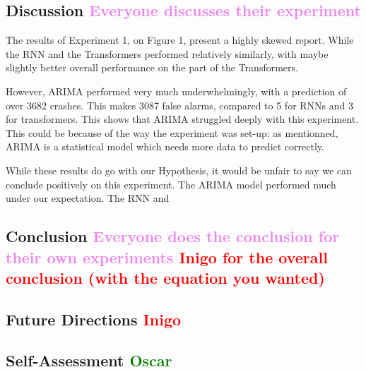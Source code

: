 \documentclass[12pt, letterpaper]{article}
\begin{document}
\subsection*{Discussion \textcolor{violet}{Everyone discusses their experiment}}

The results of Experiment 1, on Figure 1, present a highly skewed report. While the RNN and the Transformers performed relatively similarly, with maybe slightly better overall performance on the part of the Transformers.

However, ARIMA performed very much underwhelmingly, with a prediction of over 3682 crashes. This makes 3087 false alarms, compared to 5 for RNNs and 3 for transformers. This shows that ARIMA struggled deeply with this experiment. This could be because of the way the experiment was set-up: as mentionned, ARIMA is a statistical model which needs more data to predict correctly.

While these results do go with our Hypothesis, it would be unfair to say we can conclude positively on this experiment. The ARIMA model performed much under our expectation. The RNN and 

\subsection*{Conclusion \textcolor{violet}{Everyone does the conclusion for their own experiments} \textcolor{red}{Inigo for the overall conclusion (with the equation you wanted)}}



\subsection*{Future Directions \textcolor{red}{Inigo}}



\subsection*{Self-Assessment \textcolor{green}{Oscar}}
\end{document}
